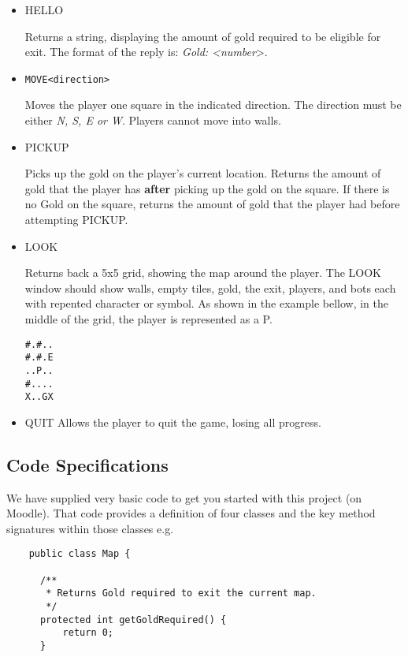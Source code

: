 \documentclass{article}
\begin{document}
{\renewcommand\labelitemi{}
\begin{itemize}
\item HELLO

Returns a string, displaying the amount of gold required to be eligible for exit. The format of the reply is: \textit{Gold: \textless number}\textgreater.

\item \begin{verbatim}MOVE<direction>\end{verbatim}

Moves the player one square in the indicated direction. The direction must be either \textit{N, S, E or W}. Players cannot move into walls.

\item PICKUP

Picks up the gold on the player's current location. Returns the amount of gold that the player has \textbf{after} picking up the gold on the square. If there is no Gold on the square, returns the amount of gold that the player had before attempting PICKUP.

\item LOOK

Returns back a 5x5 grid, showing the map around the player. The LOOK window should show walls, empty tiles, gold, the exit, players, and bots each with repented character or symbol. As shown in the example bellow, in the middle of the grid, the player is represented as a P.

\begin{verbatim}
#.#..
#.#.E
..P..
#....
X..GX
\end{verbatim}

\item QUIT
Allows the player to quit the game, losing all progress.
\end{itemize}

\subsection{Code Specifications}
We have supplied very basic code to get you started with this project (on Moodle). That code provides a definition of four classes and the key method signatures within those classes e.g.

\begin{lstlisting}
    public class Map {

      /**
       * Returns Gold required to exit the current map.
       */
      protected int getGoldRequired() {
          return 0;
      }
    

\end{lstlisting}}
\end{document}
